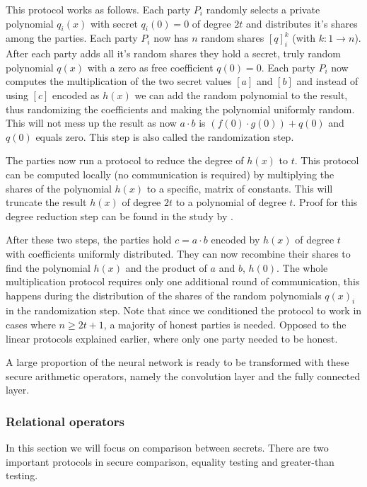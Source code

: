This protocol works as follows. Each party $P_i$ randomly selects a private polynomial $q_i(x)$ with secret $q_i(0) = 0$ of degree $2t$ and distributes it's shares among the parties. Each party $P_i$ now has $n$ random shares $[q]_i^k$ (with $k: 1 \rightarrow n$). After each party adds all it's random shares they hold a secret, truly random polynomial $q(x)$ with a zero as free coefficient $q(0) = 0$.
Each party $P_i$ now computes the multiplication of the two secret values $[a]$ and $[b]$ and instead of using $[c]$ encoded as $h(x)$ we can add the random polynomial to the result, thus randomizing the coefficients and making the polynomial uniformly random. This will not mess up the result as now $a \cdot b$  is $(f(0) \cdot g(0)) + q(0)$ and $q(0)$ equals zero. This step is also called the randomization step.


The parties now run a protocol to reduce the degree of $h(x)$ to $t$. This protocol can be computed locally (no communication is required) by multiplying the shares of the polynomial $h(x)$ to a specific, matrix of constants. This will truncate the result $h(x)$ of degree $2t$ to a polynomial of degree $t$. Proof for this degree reduction step can be found in the study by \cite{asharov2017full}.


After these two steps, the parties hold $c =a \cdot b$ encoded by $h(x)$ of degree $t$ with coefficients uniformly distributed. They can now recombine their shares to find the polynomial $h(x)$ and the product of $a$ and $b$, $h(0)$. The whole multiplication protocol requires only one additional round of communication, this happens during the distribution of the shares of the random polynomials $q(x)_i$ in the randomization step. Note that since we conditioned the protocol to work in cases where $n \geq 2t + 1$, a majority of honest parties is needed. Opposed to the linear protocols explained earlier, where only one party needed to be honest.


A large proportion of the neural network is ready to be transformed with these secure arithmetic operators, namely the convolution layer and the fully connected layer.

\subsubsection{Relational operators}
In this section we will focus on comparison between secrets. There are two important protocols in secure comparison, equality testing and greater-than testing.

